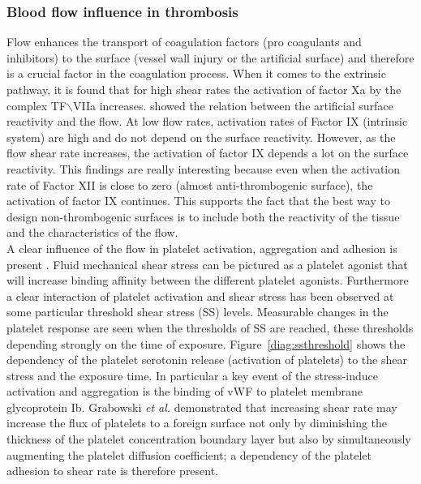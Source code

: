 \documentclass[%
 nofootinbib,
 amsmath,amssymb,
 aps,
 pra,
]{revtex4-1}
\begin{document}
\subsubsection{Blood flow influence in thrombosis}
Flow enhances the transport of coagulation factors (pro coagulants and inhibitors) to the surface (vessel wall injury or the artificial surface) and therefore is a crucial factor in the coagulation process. When it comes to the extrinsic pathway, it is found that for high shear rates the activation of factor Xa by the complex TF$\backslash$VIIa increases. \citet{Basmadjian:1997} showed the relation between the artificial surface reactivity and the flow. At low flow rates, activation rates of Factor IX (intrinsic system) are high and do not depend on  the surface reactivity. However, as the flow shear rate increases, the activation of factor IX depends a lot on the surface reactivity. This findings are really interesting because even when the activation rate of Factor XII is close to zero (almost anti-thrombogenic surface), the activation of factor IX continues. This supports the fact that the best way to design non-thrombogenic surfaces is to include both the reactivity of the tissue and the characteristics of the flow.\\
A clear influence of the flow in platelet activation, aggregation and adhesion is present \citep{Hellums:1994,Turitto:1975,Grabowski:1972}. Fluid mechanical shear stress can be pictured as a platelet agonist that will increase binding affinity between the different platelet agonists. Furthermore a clear interaction of platelet activation and shear stress has been observed at some particular threshold %
shear stress (SS) levels. Measurable changes in the platelet response are seen when the thresholds of SS are reached, these thresholds depending strongly on the time of exposure. Figure~\ref{diag:ssthreshold} shows the dependency of the platelet serotonin release (activation of platelets) to the shear stress and the exposure time. In particular a key event of the stress-induce activation and aggregation is the binding of vWF to platelet membrane glycoprotein Ib. Grabowski \textit{et al.} \citep{Grabowski:1972} demonstrated that increasing shear rate may increase the flux of platelets to a foreign surface not only by diminishing the thickness of the platelet concentration boundary layer but also by simultaneously augmenting the platelet diffusion coefficient; a dependency of the platelet adhesion to shear rate is therefore present.\\
\end{document}
